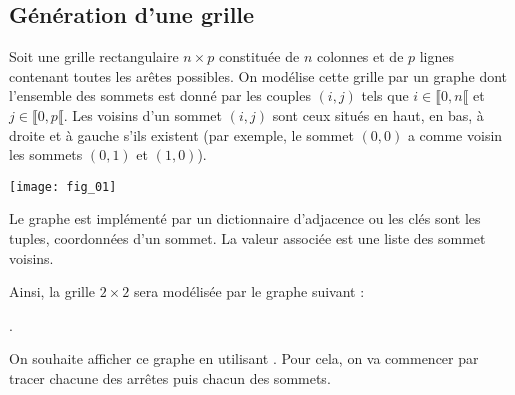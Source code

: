 %
\setcounter{numques}{0}


\subsection*{Génération d'une grille}

Soit une grille rectangulaire $n\times p$ constituée de $n$ colonnes et de $p$ lignes contenant toutes les arêtes possibles. On modélise cette grille par un graphe dont l'ensemble des sommets est donné par les couples $(i,j)$ tels que $i\in\llbracket 0,n \llbracket $ et $j\in\llbracket 0,p \llbracket $. Les voisins d'un sommet $(i,j)$ sont ceux situés en haut, en bas, à droite et à gauche s'ils existent (par exemple, le sommet $(0,0)$ a comme voisin les sommets $(0,1)$ et $(1,0)$).

\begin{center}
\texttt{[image: fig\_01]}
\end{center}

Le graphe est implémenté par un dictionnaire d'adjacence ou les clés sont les tuples, coordonnées d'un sommet. La valeur associée est une liste des sommet voisins. 


Ainsi, la grille $ 2 \times 2$ sera modélisée par le graphe suivant :

\noindent{}.


On souhaite afficher ce graphe en utilisant . Pour cela, on va commencer par tracer chacune des arrêtes puis chacun des sommets. 



